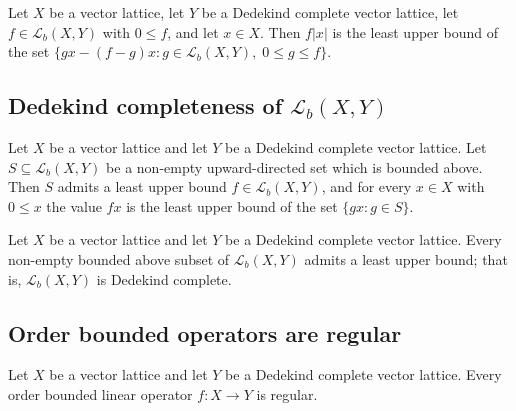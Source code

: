\begin{theorem}
\label{thm:isLUB-apply-abs}
\leanok
{}
Let $X$ be a vector lattice, let $Y$ be a Dedekind complete vector
lattice, let $f \in \mathcal{L}_b(X, Y)$ with $0 \le f$, and let
$x \in X$. Then $f \lvert x \rvert$ is the least upper bound of the
set $\{ g x - (f - g) x : g \in \mathcal{L}_b(X, Y), \; 0 \le g \le
f \}$.
\end{theorem}

\subsection{Dedekind completeness of $\mathcal{L}_b(X, Y)$}

\begin{theorem}
\label{thm:orderBoundedHom-isLUB-of-directedOn}
\leanok
{}
Let $X$ be a vector lattice and let $Y$ be a Dedekind complete
vector lattice. Let $S \subseteq \mathcal{L}_b(X, Y)$ be a non-empty
upward-directed set which is bounded above. Then $S$ admits a least
upper bound $f \in \mathcal{L}_b(X, Y)$, and for every $x \in X$
with $0 \le x$ the value $f x$ is the least upper bound of the set
$\{ g x : g \in S \}$.
\end{theorem}

\begin{theorem}
\label{thm:orderBoundedHom-exists-isLUB}
\leanok
{}
Let $X$ be a vector lattice and let $Y$ be a Dedekind complete
vector lattice. Every non-empty bounded above subset of
$\mathcal{L}_b(X, Y)$ admits a least upper bound; that is,
$\mathcal{L}_b(X, Y)$ is Dedekind complete.
\end{theorem}

\subsection{Order bounded operators are regular}

\begin{theorem}
\label{thm:isOrderBounded-isRegularOp}
\leanok
{}
Let $X$ be a vector lattice and let $Y$ be a Dedekind complete
vector lattice. Every order bounded linear operator $f \colon X
\to Y$ is regular.
\end{theorem}

